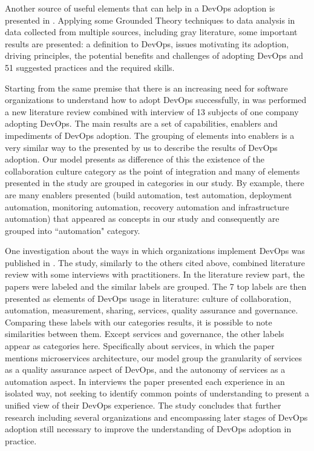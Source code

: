 Another source of useful elements that can help in a DevOps adoption is presented in \cite{characterizing_devops_sbes_2016}. Applying some Grounded Theory techniques to data analysis in data collected from multiple sources, including gray literature, some important results are presented: a definition to DevOps, issues motivating its adoption, driving principles, the potential benefits and challenges of adopting DevOps and 51 suggested practices and the required skills.

Starting from the same premise that there is an increasing need for software organizations to understand how to adopt DevOps successfully, in \cite{devops_a_definition_xp_15} was performed a new literature review combined with interview of 13 subjects of one company adopting DevOps. The main results are a set of capabilities, enablers and impediments of DevOps adoption. The
grouping of elements into enablers is a very similar way to the presented by us to describe the results of DevOps adoption. Our model presents as difference of this the existence of the collaboration culture category as the point of integration and many of elements presented in the study are grouped in categories in our study. By example, there are many enablers presented (build automation, test automation, deployment automation, monitoring automation, recovery automation and infrastructure automation) that appeared as concepts in our study and consequently are grouped into ``automation" category.

One investigation about the ways in which organizations implement DevOps was published in \cite{qualitative_devops_journalsw_17}. The study, similarly to the others cited above, combined literature review with some interviews with practitioners. In the literature review part, the papers were labeled and the similar labels are grouped. The 7 top labels are then presented as elements of DevOps usage in literature: culture of collaboration, automation, measurement, sharing, services, quality assurance and governance. Comparing these labels with our categories results, it is possible to note similarities between them. Except services and governance, the other labels appear as categories here. Specifically about services, in which the paper mentions microservices architecture, our model group the granularity of services as a quality assurance aspect of DevOps, and the autonomy of services as a automation aspect. In interviews the paper presented each experience in an isolated way, not seeking to identify common points of understanding to present a unified view of their DevOps experience. The study concludes that further research including several organizations and encompassing later stages of DevOps adoption still necessary to improve the understanding of DevOps adoption in practice.

